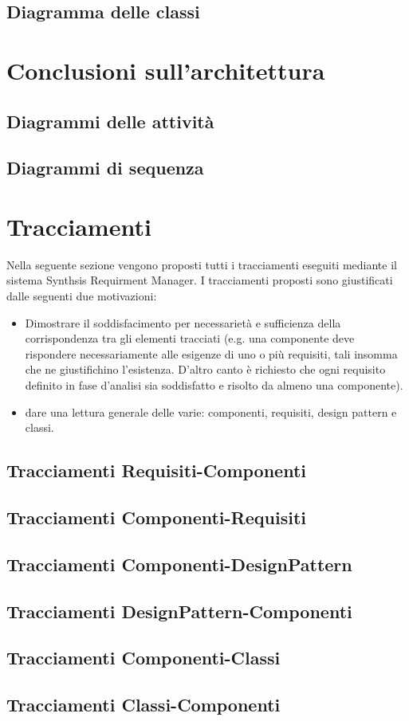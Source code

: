 \subsection{Diagramma delle classi}
\clearpage

\section{Conclusioni sull'architettura}

\subsection{Diagrammi delle attività}

\subsection{Diagrammi di sequenza}
\clearpage

\section{Tracciamenti}
Nella seguente sezione vengono proposti tutti i tracciamenti eseguiti mediante il sistema Synthsis Requirment Manager. I tracciamenti proposti sono giustificati dalle seguenti due motivazioni:

\begin{itemize}
	\item Dimostrare il soddisfacimento per necessarietà e sufficienza della corrispondenza tra gli elementi tracciati (e.g. una componente deve rispondere necessariamente alle esigenze di uno o più requisiti, tali insomma che ne giustifichino l'esistenza. D'altro canto è richiesto che ogni requisito definito in fase d'analisi sia soddisfatto e risolto da almeno una componente).
	\item dare una lettura generale delle varie: componenti, requisiti, design pattern e classi.
\end{itemize}

\subsection{Tracciamenti Requisiti-Componenti}

\subsection{Tracciamenti Componenti-Requisiti}

\subsection{Tracciamenti Componenti-DesignPattern}

\subsection{Tracciamenti DesignPattern-Componenti}

\subsection{Tracciamenti Componenti-Classi}

\subsection{Tracciamenti Classi-Componenti}


